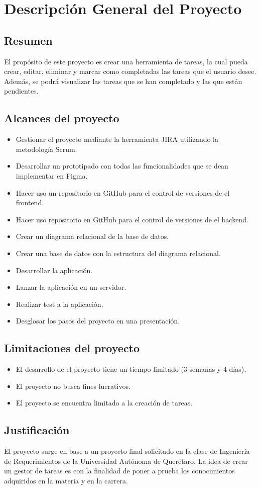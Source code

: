 \chapter{Descripción General del Proyecto}
\section{Resumen}
El propósito de este proyecto es crear una herramienta de tareas, la cual pueda crear, editar, eliminar y marcar como completadas
las tareas que el usuario desee. Además, se podrá visualizar las tareas que se han completado y las que están pendientes.

\section{Alcances del proyecto}
\begin{itemize}
  \item Gestionar el proyecto mediante la herramienta JIRA utilizando la metodología Scrum.
  \item Desarrollar un prototipado con todas las funcionalidades que se dean implementar en Figma.
  \item Hacer uso un repositorio en GitHub para el control de versiones de el frontend.
  \item Hacer uso repositorio en GitHub para el control de versiones de el backend.
  \item Crear un diagrama relacional de la base de datos.
  \item Crear una base de datos con la estructura del diagrama relacional.
  \item Desarrollar la aplicación.
  \item Lanzar la aplicación en un servidor.
  \item Realizar test a la aplicación.
  \item Desglosar los pasos del proyecto en una presentación.
\end{itemize}

\section{Limitaciones del proyecto}
\begin{itemize}
  \item El desarrollo de el proyecto tiene un tiempo limitado (3 semanas y 4 días).
  \item El proyecto no busca fines lucrativos.
  \item El proyecto se encuentra limitado a la creación de tareas.
\end{itemize}


\section{Justificación}
El proyecto surge en base a un proyecto final solicitado en la clase de Ingeniería de Requerimientos
de la Universidad Autónoma de Querétaro. La idea de crear un gestor de tareas es con la finalidad de poner 
a prueba los conocimientos adquiridos en la materia y en la carrera.
